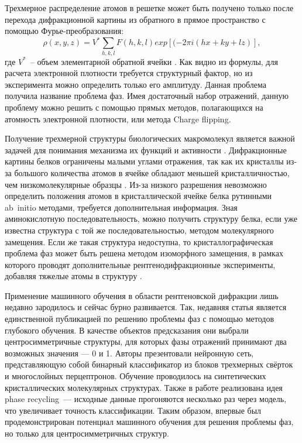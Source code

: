 \documentclass[a4paper,12pt]{article}
\begin{document}
{Трехмерное распределение атомов в решетке может быть получено только после перехода дифракционной картины из обратного в прямое пространство с помощью Фурье-преобразования: \[\rho(x, y, z) = V^*\sum_{h,k,l} F(h,k,l) exp[(-2\pi i (hx+ky+lz)],\] где $V^*$~-- объем элементарной обратной ячейки \cite{giro}. Как видно из формулы, для расчета электронной плотности требуется структурный фактор, но из эксперимента можно определить только его амплитуду. Данная проблема получила название проблема фаз. Имея достаточный набор отражений, данную проблему можно решить с помощью прямых методов, полагающихся на атомность электронной плотности, или метода Charge flipping.

Получение трехмерной структуры биологических макромолекул является важной задачей для понимания механизма их функций и активности \cite{xrdsap}. Дифракционные картины белков ограничены малыми углами отражения, так как их кристаллы из-за большого количества атомов в ячейке обладают меньшей кристалличностью, чем низкомолекулярные образцы \cite{giro}. Из-за низкого разрешения невозможно определить положения атомов в кристаллической ячейке белка рутинными ab~initio методами, требуется дополнительная информация. Зная аминокислотную последовательность, можно получить структуру белка, если уже известна структура с той же последовательностью, методом молекулярного замещения. Если же такая структура недоступна, то кристаллографическая проблема фаз может быть решена методом изоморфного замещения, в рамках которого проводят дополнительные рентгенодифракционные эксперименты, добавляя тяжелые атомы в структуру \cite{acta}.

Применение машинного обучения в области рентгеновской дифракции лишь недавно зародилось и сейчас бурно развивается. Так, недавняя статья \cite{science} является единственной публикацией по решению проблемы фаз с помощью методов глубокого обучения. В качестве объектов предсказания они выбрали центросимметричные структуры, для которых фазы отражений принимают два возможных значения --- 0 и 1. Авторы презентовали нейронную сеть, представляющую собой бинарный классификатор из блоков трехмерных свёрток и многослойных перцептронов. Обучение проводилось на синтетических кристаллических молекулярных структурах. Также в работе реализована идея phase recycling~--- исходные данные прогоняются несколько раз через модель, что увеличивает точность классификации. Таким образом, впервые был продемонстрирован потенциал машинного обучения для решения проблемы фаз, но только для центросимметричных структур.

}
\end{document}
